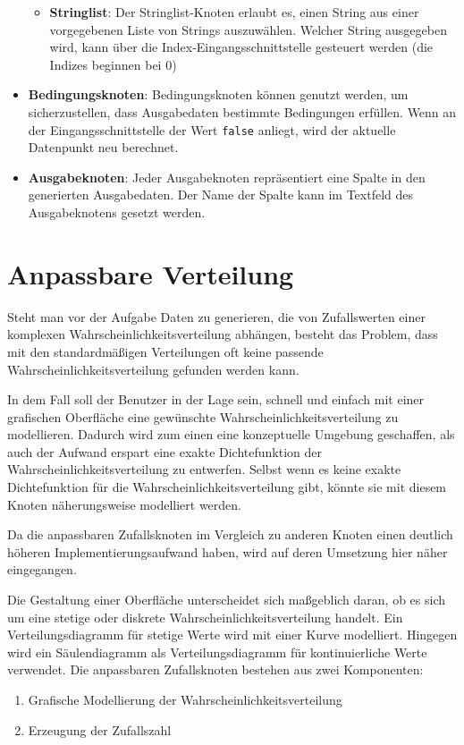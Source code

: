 \begin{itemize}
\begin{itemize}
        \item \textbf{Stringlist}: Der Stringlist-Knoten erlaubt es, einen String aus einer vorgegebenen Liste von Strings auszuwählen. Welcher String ausgegeben wird, kann über die Index-Eingangsschnittstelle gesteuert werden (die Indizes beginnen bei 0)
    \end{itemize}
    \item \textbf{Bedingungsknoten}: Bedingungsknoten können genutzt werden, um sicherzustellen, dass Ausgabedaten bestimmte Bedingungen erfüllen. Wenn an der Eingangsschnittstelle der Wert \texttt{false} anliegt, wird der aktuelle Datenpunkt neu berechnet.
    \item \textbf{Ausgabeknoten}: Jeder Ausgabeknoten repräsentiert eine Spalte in den generierten Ausgabedaten. Der Name der Spalte kann im Textfeld des Ausgabeknotens gesetzt werden.
\end{itemize}

\section{Anpassbare Verteilung}
\label{sec:anpassbareverteilung}

Steht man vor der Aufgabe Daten zu generieren, die von Zufallswerten einer komplexen Wahrscheinlichkeitsverteilung abhängen, besteht das Problem, dass mit den standardmäßigen Verteilungen oft keine passende Wahrscheinlichkeitsverteilung gefunden werden kann. 

In dem Fall soll der Benutzer in der Lage sein, schnell und einfach mit einer grafischen Oberfläche eine gewünschte Wahrscheinlichkeitsverteilung zu modellieren. Dadurch wird zum einen eine konzeptuelle Umgebung geschaffen, als auch der Aufwand erspart eine exakte Dichtefunktion der Wahrscheinlichkeitsverteilung zu entwerfen. Selbst wenn es keine exakte Dichtefunktion für die Wahrscheinlichkeitsverteilung gibt, könnte sie mit diesem Knoten näherungsweise modelliert werden.

Da die anpassbaren Zufallsknoten im Vergleich zu anderen Knoten einen deutlich höheren Implementierungsaufwand haben, wird auf deren Umsetzung hier näher eingegangen.

Die Gestaltung einer Oberfläche unterscheidet sich maßgeblich daran, ob es sich um eine stetige oder diskrete Wahrscheinlichkeitsverteilung handelt. Ein Verteilungsdiagramm für stetige Werte wird mit einer Kurve modelliert. Hingegen wird ein Säulendiagramm als Verteilungsdiagramm für kontinuierliche Werte verwendet. Die anpassbaren Zufallsknoten bestehen aus zwei Komponenten: 
\begin{enumerate}
    \item Grafische Modellierung der Wahrscheinlichkeitsverteilung
    \item Erzeugung der Zufallszahl
\end{enumerate}

